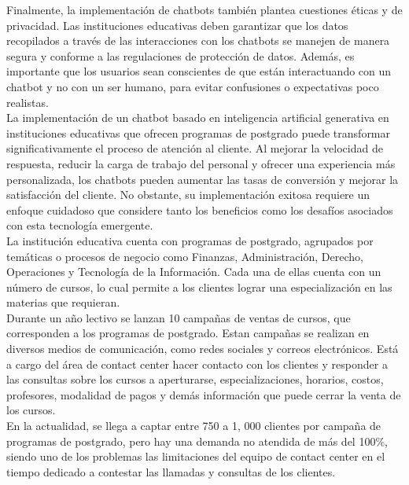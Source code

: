 \documentclass[10pt,a4paper]{article}
\begin{document}
Finalmente, la implementación de chatbots también plantea cuestiones éticas y de privacidad. Las instituciones educativas deben garantizar que los datos recopilados a través de las interacciones con los chatbots se manejen de manera segura y conforme a las regulaciones de protección de datos. Además, es importante que los usuarios sean conscientes de que están interactuando con un chatbot y no con un ser humano, para evitar confusiones o expectativas poco realistas.\\

La implementación de un chatbot basado en inteligencia artificial generativa en instituciones educativas que ofrecen programas de postgrado puede transformar significativamente el proceso de atención al cliente. Al mejorar la velocidad de respuesta, reducir la carga de trabajo del personal y ofrecer una experiencia más personalizada, los chatbots pueden aumentar las tasas de conversión y mejorar la satisfacción del cliente. No obstante, su implementación exitosa requiere un enfoque cuidadoso que considere tanto los beneficios como los desafíos asociados con esta tecnología emergente.\\

La institución educativa cuenta con programas de postgrado, agrupados por temáticas o procesos de negocio como Finanzas, Administración, Derecho, Operaciones y Tecnología de la Información. Cada una de ellas cuenta con un número de cursos, lo cual permite a los clientes lograr una especialización en las materias que requieran.\\

Durante un año lectivo se lanzan 10 campañas de ventas de cursos, que corresponden a los programas de postgrado. Estan campañas se realizan en diversos medios de comunicación, como redes sociales y correos electrónicos. Está a cargo del área de contact center hacer contacto con los clientes y responder a las consultas sobre los cursos a aperturarse, especializaciones, horarios, costos, profesores, modalidad de pagos y demás información que puede cerrar la venta de los cursos.\\

En la actualidad, se llega a captar entre 750 a 1, 000 clientes por campaña de programas de postgrado, pero hay una demanda no atendida de más del 100\%, siendo uno de los problemas las limitaciones del equipo de contact center en el tiempo dedicado a contestar las llamadas y consultas de los clientes.

		    
\end{document}
